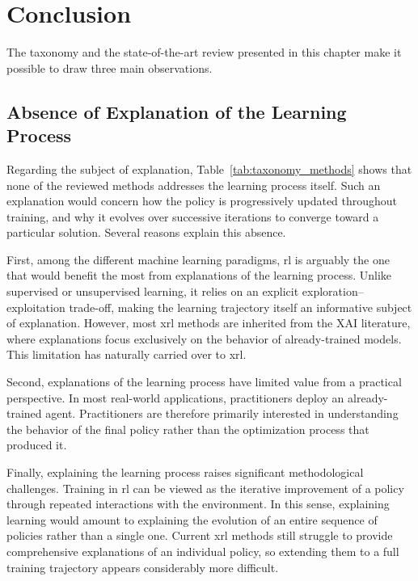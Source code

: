 \section{Conclusion}
\label{sec:explainability_reinforcement_learning_conclusion}

The taxonomy and the state-of-the-art review presented in this chapter make it possible to draw three main observations.

\subsection{Absence of Explanation of the Learning Process}

Regarding the subject of explanation, Table~\ref{tab:taxonomy_methods} shows that none of the reviewed methods addresses the learning process itself.
Such an explanation would concern how the policy is progressively updated throughout training, and why it evolves over successive iterations to converge toward a particular solution.
Several reasons explain this absence.

First, among the different machine learning paradigms, \gls{rl} is arguably the one that would benefit the most from explanations of the learning process.
Unlike supervised or unsupervised learning, it relies on an explicit exploration--exploitation trade-off, making the learning trajectory itself an informative subject of explanation.
However, most \gls{xrl} methods are inherited from the XAI literature, where explanations focus exclusively on the behavior of already-trained models.
This limitation has naturally carried over to \gls{xrl}.

Second, explanations of the learning process have limited value from a practical perspective.
In most real-world applications, practitioners deploy an already-trained agent.
Practitioners are therefore primarily interested in understanding the behavior of the final policy rather than the optimization process that produced it.

Finally, explaining the learning process raises significant methodological challenges.
Training in \gls{rl} can be viewed as the iterative improvement of a policy through repeated interactions with the environment.
In this sense, explaining learning would amount to explaining the evolution of an entire sequence of policies rather than a single one.
Current \gls{xrl} methods still struggle to provide comprehensive explanations of an individual policy, so extending them to a full training trajectory appears considerably more difficult.

